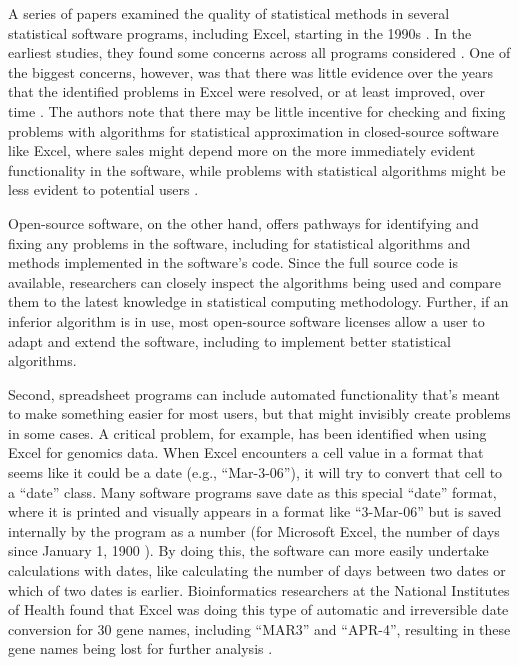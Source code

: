 \documentclass[]{tufte-book}
\begin{document}
A series of papers examined the quality of statistical methods in several
statistical software programs, including Excel, starting in the 1990s
\citep{mccullough1999accuracy, mccullough1999assessing, mccullough2002accuracy, mccullough2005accuracy, mccullough2008accuracy, melard2014accuracy}. In the
earliest studies, they found some concerns across all programs considered
\citep{mccullough1999accuracy, mccullough1999assessing}. One of the biggest
concerns, however, was that there was little evidence over the years that the
identified problems in Excel were resolved, or at least improved, over time
\citep{mccullough2001does, mccullough2008accuracy}. The authors note that there may
be little incentive for checking and fixing problems with algorithms for
statistical approximation in closed-source software like Excel, where sales
might depend more on the more immediately evident functionality in the software,
while problems with statistical algorithms might be less evident to potential
users \citep{mccullough2001does}.

Open-source software, on the other hand, offers pathways for identifying and fixing
any problems in the software, including for statistical algorithms and methods
implemented in the software's code. Since the full source code is available, researchers
can closely inspect the algorithms being used and compare them to the latest
knowledge in statistical computing methodology. Further, if an inferior algorithm is in
use, most open-source software licenses allow a user to adapt and extend the software,
including to implement better statistical algorithms.

Second, spreadsheet programs can include automated functionality that's meant to
make something easier for most users, but that might invisibly create problems
in some cases. A critical problem, for example, has been identified when using
Excel for genomics data. When Excel encounters a cell value in a format that
seems like it could be a date (e.g., ``Mar-3-06''), it will try to convert that
cell to a ``date'' class. Many software programs save date as this special ``date''
format, where it is printed and visually appears in a format like ``3-Mar-06'' but
is saved internally by the program as a number (for Microsoft Excel, the number
of days since January 1, 1900 \citep{willekens2013chronological}). By doing this, the
software can more easily undertake calculations with dates, like calculating the
number of days between two dates or which of two dates is earlier.
Bioinformatics researchers at the National Institutes of Health found that Excel
was doing this type of automatic and irreversible date conversion for 30 gene
names, including ``MAR3'' and ``APR-4'', resulting in these gene names being lost
for further analysis \citep{zeeberg2004mistaken}.
\end{document}
